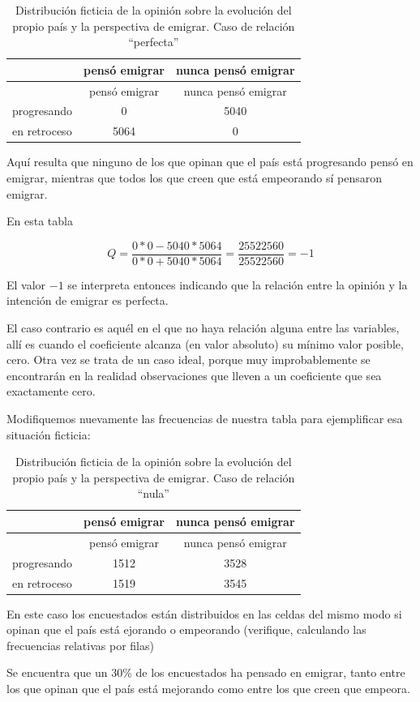 \documentclass[]{book}
\begin{document}
\begin{longtable}[]{@{}lcc@{}}
\caption{\label{tab:unnamed-chunk-118}Distribución ficticia de la opinión sobre la evolución del propio país y la perspectiva de emigrar. Caso de relación ``perfecta''}\tabularnewline
\toprule
& pensó emigrar & nunca pensó emigrar\tabularnewline
\midrule
\endfirsthead
\toprule
& pensó emigrar & nunca pensó emigrar\tabularnewline
\midrule
\endhead
progresando & 0 & 5040\tabularnewline
en retroceso & 5064 & 0\tabularnewline
\bottomrule
\end{longtable}

Aquí resulta que ninguno de los que opinan que el país está progresando pensó en emigrar, mientras que todos los que creen que está empeorando sí pensaron emigrar.

En esta tabla

\[Q = \frac{0*0 - 5040*5064}{0*0+5040*5064} = \frac{25522560}{25522560} = -1\]

El valor \(-1\) se interpreta entonces indicando que la relación entre la opinión y la intención de emigrar es perfecta.

El caso contrario es aquél en el que no haya relación alguna entre las
variables, allí es cuando el coeficiente alcanza (en valor absoluto) su mínimo valor posible, cero. Otra vez se trata de un caso ideal, porque muy improbablemente se encontrarán en la realidad observaciones que lleven a un coeficiente que sea exactamente cero.

Modifiquemos nuevamente las frecuencias de nuestra tabla para
ejemplificar esa situación ficticia:

\begin{longtable}[]{@{}lcc@{}}
\caption{\label{tab:unnamed-chunk-119}Distribución ficticia de la opinión sobre la evolución del propio país y la perspectiva de emigrar. Caso de relación ``nula''}\tabularnewline
\toprule
& pensó emigrar & nunca pensó emigrar\tabularnewline
\midrule
\endfirsthead
\toprule
& pensó emigrar & nunca pensó emigrar\tabularnewline
\midrule
\endhead
progresando & 1512 & 3528\tabularnewline
en retroceso & 1519 & 3545\tabularnewline
\bottomrule
\end{longtable}

En este caso los encuestados están distribuidos en las celdas del mismo modo si opinan que el país está ejorando o empeorando (verifique, calculando las frecuencias relativas por filas)

Se encuentra que un 30\% de los encuestados ha pensado en emigrar, tanto entre los que opinan que el país está mejorando como entre los que creen que empeora.
\end{document}
